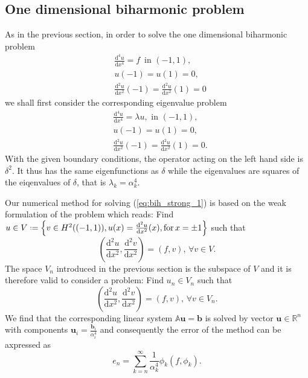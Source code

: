 \documentclass[a4paper,10pt]{article}
\newcommand{\R}{\ensuremath{\mathbb{R}}}
\newcommand{\inner}[2]{\ensuremath{\left(#1, #2\right)}}
\newcommand{\deriv}[2]{\ensuremath{\frac{\mathrm{d}#1}{\mathrm{d}#2}}}
\newcommand*{\defeq}{\mathrel{\vcenter{\baselineskip0.5ex \lineskiplimit0pt
                     \hbox{\scriptsize.}\hbox{\scriptsize.}}}%
                     =}
\begin{document}
  \subsection{One dimensional biharmonic problem}
  As in the previous section, in order to solve the one dimensional biharmonic
  problem
  \begin{equation}
  \label{eq:bih_strong_1}
  \begin{aligned}
    &\deriv{^4u}{x^4} = f\,\text{ in }(-1, 1),\\
    &u(-1) = u(1) = 0,\\
    &\deriv{^2u}{x^2}(-1) = \deriv{^2u}{x^2}(1) = 0
  \end{aligned}
  \end{equation}
  we shall first consider the corresponding eigenvalue problem
  \begin{equation}
  \begin{aligned}
    &\deriv{^4u}{x^4} = \lambda u,\text{ in }(-1, 1),\\
    &u(-1) = u(1) = 0,\\
    &\deriv{^2u}{x^2}(-1) = \deriv{^2u}{x^2}(1) = 0.
  \end{aligned}
  \end{equation}
  With the given boundary conditions, the operator acting on the left hand
  side is $\delta^2$. It thus has the same eigenfunctions as $\delta$ while
  the eigenvalues are squares of the eiqenvalues of $\delta$, that is
  $\lambda_k=\alpha_k^4$.
  
  Our numerical method for solving (\ref{eq:bih_strong_1}) is based on the 
  weak formulation of the problem which reads: Find $u\in V\defeq\left\{v\in
  H^2((-1, 1)), u(x)=\deriv{^2u}{x^2}(x),\text{for}\,x=\pm 1\right\}$ such that
  \[
    \inner{\deriv{^2u}{x^2}}{\deriv{^2v}{x^2}} = \inner{f}{v},\,\forall v\in V.
  \]
  The space $V_n$ introduced in the previous section is the subspace of $V$
  and it is therefore valid to consider a problem: Find $u_n\in V_n$ such that
  \begin{equation}
    \label{eq:bih_weak_1}
    \inner{\deriv{^2u}{x^2}}{\deriv{^2v}{x^2}} = \inner{f}{v},\,\forall v\in V_n.
  \end{equation}
  We find that the corresponding linear system $\mathbb{A}\mathbf{u}=\mathbf{b}$
  is solved by vector $\mathbf{u}\in\R^n$ with components
  $\mathbf{u}_i=\frac{\mathbf{b}_i}{\alpha_i^4}$ and consequently the error of the
  method can be axpressed as
  \[
    e_n = \sum_{k=n}^{\infty} \frac{1}{\alpha_k^4} \phi_k (f, \phi_k).
  \]
\end{document}
